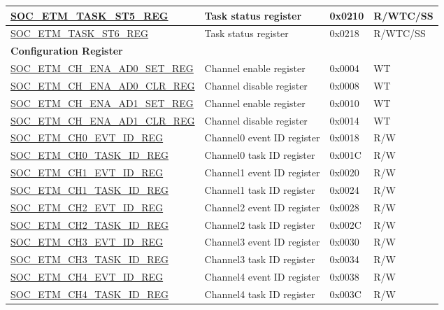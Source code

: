 \begin{longtable}{ | p{6cm} | p{6.4cm} | p{1.3cm} | p{1.8cm} | }
\hyperref[regdesc:SOCETMTASKST5REG]{SOC\_ETM\_TASK\_ST5\_REG} & Task status register & 0x0210 & R/WTC/SS \\ \hline
\hyperref[regdesc:SOCETMTASKST6REG]{SOC\_ETM\_TASK\_ST6\_REG} & Task status register & 0x0218 & R/WTC/SS \\ \hline
\multicolumn{4}{|l|}{\textbf{Configuration Register}} \\ \hline
\hyperref[regdesc:SOCETMCHENAAD0SETREG]{SOC\_ETM\_CH\_ENA\_AD0\_SET\_REG} & Channel enable register & 0x0004 & WT \\ \hline
\hyperref[regdesc:SOCETMCHENAAD0CLRREG]{SOC\_ETM\_CH\_ENA\_AD0\_CLR\_REG} & Channel disable register & 0x0008 & WT \\ \hline
\hyperref[regdesc:SOCETMCHENAAD1SETREG]{SOC\_ETM\_CH\_ENA\_AD1\_SET\_REG} & Channel enable register & 0x0010 & WT \\ \hline
\hyperref[regdesc:SOCETMCHENAAD1CLRREG]{SOC\_ETM\_CH\_ENA\_AD1\_CLR\_REG} & Channel disable register & 0x0014 & WT \\ \hline
\hyperref[regdesc:SOCETMCH0EVTIDREG]{SOC\_ETM\_CH0\_EVT\_ID\_REG} & Channel0 event ID register & 0x0018 & R/W \\ \hline
\hyperref[regdesc:SOCETMCH0TASKIDREG]{SOC\_ETM\_CH0\_TASK\_ID\_REG} & Channel0 task ID register & 0x001C & R/W \\ \hline
\hyperref[regdesc:SOCETMCH0EVTIDREG]{SOC\_ETM\_CH1\_EVT\_ID\_REG} & Channel1 event ID register & 0x0020 & R/W \\ \hline
\hyperref[regdesc:SOCETMCH0TASKIDREG]{SOC\_ETM\_CH1\_TASK\_ID\_REG} & Channel1 task ID register & 0x0024 & R/W \\ \hline
\hyperref[regdesc:SOCETMCH0EVTIDREG]{SOC\_ETM\_CH2\_EVT\_ID\_REG} & Channel2 event ID register & 0x0028 & R/W \\ \hline
\hyperref[regdesc:SOCETMCH0TASKIDREG]{SOC\_ETM\_CH2\_TASK\_ID\_REG} & Channel2 task ID register & 0x002C & R/W \\ \hline
\hyperref[regdesc:SOCETMCH0EVTIDREG]{SOC\_ETM\_CH3\_EVT\_ID\_REG} & Channel3 event ID register & 0x0030 & R/W \\ \hline
\hyperref[regdesc:SOCETMCH0TASKIDREG]{SOC\_ETM\_CH3\_TASK\_ID\_REG} & Channel3 task ID register & 0x0034 & R/W \\ \hline
\hyperref[regdesc:SOCETMCH0EVTIDREG]{SOC\_ETM\_CH4\_EVT\_ID\_REG} & Channel4 event ID register & 0x0038 & R/W \\ \hline
\hyperref[regdesc:SOCETMCH0TASKIDREG]{SOC\_ETM\_CH4\_TASK\_ID\_REG} & Channel4 task ID register & 0x003C & R/W \\ \hline

\end{longtable}
